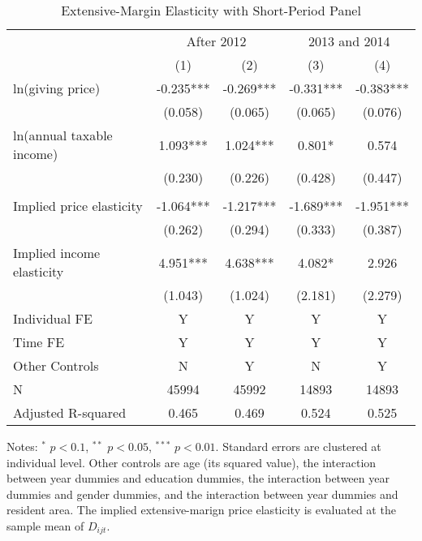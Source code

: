 \documentclass[
  11pt,
  a4paper,
]{article}
\begin{document}
\begin{table}

\caption{\label{tab:ShortExtensive}Extensive-Margin Elasticity with Short-Period Panel}
\centering
\fontsize{7}{9}\selectfont
\begin{threeparttable}
\begin{tabular}[t]{lcccc}
\toprule
\multicolumn{1}{c}{ } & \multicolumn{2}{c}{After 2012} & \multicolumn{2}{c}{2013 and 2014} \\
\cmidrule(l{3pt}r{3pt}){2-3} \cmidrule(l{3pt}r{3pt}){4-5}
 & (1) & (2) & (3) & (4)\\
\midrule
ln(giving price) & -0.235*** & -0.269*** & -0.331*** & -0.383***\\
 & (0.058) & (0.065) & (0.065) & (0.076)\\
ln(annual taxable income) & 1.093*** & 1.024*** & 0.801* & 0.574\\
 & (0.230) & (0.226) & (0.428) & (0.447)\\
 &  &  &  & \\
Implied price elasticity & -1.064*** & -1.217*** & -1.689*** & -1.951***\\
 & (0.262) & (0.294) & (0.333) & (0.387)\\
Implied income elasticity & 4.951*** & 4.638*** & 4.082* & 2.926\\
 & (1.043) & (1.024) & (2.181) & (2.279)\\
Individual FE & Y & Y & Y & Y\\
Time FE & Y & Y & Y & Y\\
Other Controls & N & Y & N & Y\\
N & 45994 & 45992 & 14893 & 14893\\
Adjusted R-squared & 0.465 & 0.469 & 0.524 & 0.525\\
\bottomrule
\end{tabular}
\begin{tablenotes}
\item Notes: $^{*}$ $p < 0.1$, $^{**}$ $p < 0.05$, $^{***}$ $p < 0.01$. Standard errors are clustered at individual level. Other controls are age (its squared value), the interaction between year dummies and education dummies, the interaction between year dummies and gender dummies, and the interaction between year dummies and resident area. The implied extensive-marign price elasticity is evaluated at the sample mean of $D_{ijt}$.
\end{tablenotes}
\end{threeparttable}
\end{table}
\end{document}

